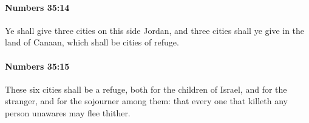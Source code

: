 		\paragraph{Numbers 35:14} %
			\label{NUMBERS-35-14}

			Ye shall give three cities on this side Jordan, and three cities shall ye give in the land of Canaan, which shall be cities of refuge.


		\paragraph{Numbers 35:15} %
			\label{NUMBERS-35-15}

			These six cities shall be a refuge, both for the children of Israel, and for the stranger, and for the sojourner among them: that every one that killeth any person unawares may flee thither.


